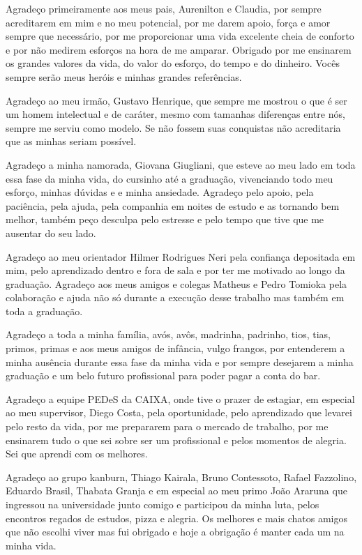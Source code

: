 \begin{agradecimentos}

Agradeço primeiramente aos meus pais, Aurenilton e Claudia, por sempre acreditarem em mim e no meu potencial, por me darem apoio, força e amor sempre que necessário, por me proporcionar uma vida excelente cheia de conforto e por não medirem esforços na hora de me amparar. Obrigado por me ensinarem os grandes valores da vida, do valor do esforço, do tempo e do dinheiro. Vocês sempre serão meus heróis e minhas grandes referências.

Agradeço ao meu irmão, Gustavo Henrique, que sempre me mostrou o que é ser um homem intelectual e de caráter, mesmo com tamanhas diferenças entre nós, sempre me serviu como modelo. Se não fossem suas conquistas não acreditaria que as minhas seriam possível.

Agradeço a minha namorada, Giovana Giugliani, que esteve ao meu lado em toda essa fase da minha vida, do cursinho até a graduação, vivenciando todo meu esforço,  minhas dúvidas e e minha ansiedade. Agradeço pelo apoio, pela paciência, pela ajuda, pela companhia em noites de estudo e as tornando bem melhor, também peço desculpa pelo estresse e pelo tempo que tive que me ausentar do seu lado. 

Agradeço ao meu orientador Hilmer Rodrigues Neri pela confiança depositada em mim, pelo aprendizado dentro e fora de sala e por ter me motivado ao longo da graduação. Agradeço aos meus amigos e colegas Matheus e Pedro Tomioka pela colaboração e ajuda não só durante a execução desse trabalho mas também em toda a graduação.

Agradeço a toda a minha família, avós, avôs, madrinha, padrinho, tios, tias, primos, primas e   aos meus amigos de infância, vulgo frangos, por entenderem a minha ausência durante essa fase da minha vida e por sempre desejarem a minha graduação e um belo futuro profissional para poder pagar a conta do bar.

Agradeço a equipe PEDeS da CAIXA, onde tive o prazer de estagiar, em especial ao meu supervisor, Diego Costa, pela oportunidade, pelo aprendizado que levarei pelo resto da vida, por me prepararem para o mercado de trabalho, por me ensinarem tudo o que sei sobre ser um profissional e pelos momentos de alegria. Sei que aprendi com os melhores.

Agradeço ao grupo kanburn, Thiago Kairala, Bruno Contessoto, Rafael Fazzolino, Eduardo Brasil, Thabata Granja e em especial ao meu primo João Araruna que ingressou na universidade junto comigo e participou da minha luta, pelos encontros regados de estudos, pizza e alegria. Os melhores e mais chatos amigos que não escolhi viver mas fui obrigado e hoje a obrigação é manter cada um na minha vida.

\end{agradecimentos}